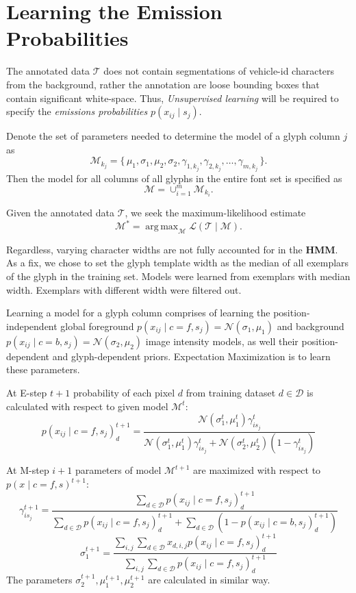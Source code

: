 \documentclass[a4paper,12pt]{article}
\newcommand{\lhood}{\ensuremath{\mathcal{L}}}
\newcommand{\truth}{\ensuremath{\mathcal{T}}}
\newcommand{\model}{\ensuremath{\mathcal{M}}}
\newcommand{\optmodel}{\ensuremath{\mathcal{M}^*}}
\DeclareMathOperator*{\argmax}{arg\,max}
\renewcommand{\ohnote}[1]{} }
\begin{document}
\section{Learning the Emission Probabilities}
The annotated data $\truth$ does not contain segmentations of
vehicle-id characters from the background, rather the annotation are
loose bounding boxes that contain significant white-space. Thus,
\emph{Unsupervised learning} will be required to specify the
\emph{emissions probabilities} $p(x_{ij} \mid s_j)$.

Denote the set of parameters needed to determine the model of a glyph
column $j$ as
\[\model_{k_j}=\{\,\mu_1,\sigma_1,\mu_2,\sigma_2,\gamma_{1,k_j},\gamma_{2,k_j},\ldots,\gamma_{m,k_j}\,\}.\]
Then the model for all columns of all glyphs in the entire font set is
specified as
\[
\model = \cup_{i=1}^m\model_{k_i}.
\]

Given the annotated data $\truth$, we seek the maximum-likelihood
estimate \[ \optmodel = \argmax_{\model} \lhood(\truth \mid \model).\]

Regardless, varying character widths are not fully accounted for in
the \textbf{HMM}. As a fix, we chose to set the glyph template width
as the median of all exemplars of the glyph in the training
set. Models were learned from exemplars with median width. Exemplars with different width were filtered out.
\ohnote{This is short but sufficient I think}

Learning a model for a glyph column comprises of learning the
position-independent global foreground $ p(x_{ij}\mid
c=f,s_j)=\mathcal{N}(\sigma_1,\mu_1)$ and background $p(x_{ij} \mid
c=b,s_j)=\mathcal{N}(\sigma_2,\mu_2)$ image intensity models, as well
their position-dependent and glyph-dependent priors. Expectation
Maximization is to learn these parameters.

At E-step $t+1$ probability of each pixel $d$ from training dataset $d \in \mathcal{D}$ is calculated with respect to given model $\model^t$:
\[
  p(x_{ij} \mid c=f, s_j)_d^{t+1} = \frac{\mathcal{N}(\sigma_1^t,\mu_1^t)\gamma_{is_j}^t}{\mathcal{N}(\sigma_1^t,\mu_1^t)\gamma_{is_j}^t+\mathcal{N}(\sigma_2^t,\mu_2^t)(1-\gamma_{is_j}^t)}
\]

At M-step $i+1$ parameters of model $\model^{t+1}$ are maximized with respect to $p(x \mid c=f, s)^{t+1}$:
\[
  \gamma_{is_j}^{t+1} = \frac{\sum_{d \in \mathcal{D}} p(x_{ij} \mid c=f, s_j)_d^{t+1}}{\sum_{d \in \mathcal{D}} p(x_{ij} \mid c=f, s_j)_d^{t+1} + \sum_{d \in \mathcal{D}} (1-p(x_{ij} \mid c=b, s_j)_d^{t+1})}
\]
\[
  \sigma_1^{t+1} = \frac{\sum_{i,j} \sum_{d \in \mathcal{D}} x_{d, i,j} p(x_{ij} \mid c=f, s_j)_d^{t+1} }{\sum_{i,j} \sum_{d \in \mathcal{D}} p(x_{ij} \mid c=f, s_j)_d^{t+1}}
\]
The parameters $\sigma_2^{t+1}, \mu_1^{t+1}, \mu_2^{t+1}$ are calculated in similar way.
\end{document}
